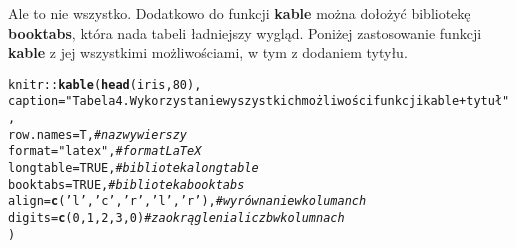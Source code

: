 \documentclass[a4paper, 10pt]{article}\usepackage[]{graphicx}\usepackage[]{color}
\makeatletter
\newcommand{\hlnum}[1]{\textcolor[rgb]{0.686,0.059,0.569}{#1}}%
\newcommand{\hlstr}[1]{\textcolor[rgb]{0.192,0.494,0.8}{#1}}%
\newcommand{\hlcom}[1]{\textcolor[rgb]{0.678,0.584,0.686}{\textit{#1}}}%
\newcommand{\hlopt}[1]{\textcolor[rgb]{0,0,0}{#1}}%
\newcommand{\hlstd}[1]{\textcolor[rgb]{0.345,0.345,0.345}{#1}}%
\newcommand{\hlkwc}[1]{\textcolor[rgb]{0.333,0.667,0.333}{#1}}%
\newcommand{\hlkwd}[1]{\textcolor[rgb]{0.737,0.353,0.396}{\textbf{#1}}}%
\newenvironment{kframe}{%
 \def\at@end@of@kframe{}%
 \ifinner\ifhmode%
  \def\at@end@of@kframe{\end{minipage}}%
  \begin{minipage}{\columnwidth}%
 \fi\fi%
 \def\FrameCommand##1{\hskip\@totalleftmargin \hskip-\fboxsep
 \colorbox{shadecolor}{##1}\hskip-\fboxsep
     \hskip-\linewidth \hskip-\@totalleftmargin \hskip\columnwidth}%
 \MakeFramed {\advance\hsize-\width
   \@totalleftmargin\z@ \linewidth\hsize
   \@setminipage}}%
 {\par\unskip\endMakeFramed%
 \at@end@of@kframe}
\makeatother
\begin{document}
Ale to nie wszystko. Dodatkowo do funkcji \textbf{kable} można dołożyć bibliotekę \textbf{booktabs}, która nada tabeli ładniejszy wygląd. Poniżej zastosowanie funkcji \textbf{kable} z jej wszystkimi możliwościami, w tym z dodaniem tytyłu.


\begin{kframe}
\begin{alltt}
\hlstd{knitr}\hlopt{::} \hlkwd{kable}\hlstd{(} \hlkwd{head}\hlstd{(iris,} \hlnum{80}\hlstd{) ,}
        \hlkwc{caption}\hlstd{=}\hlstr{"Tabela 4. Wykorzystanie wyszystkich możliwości funkcji kable + tytuł"}\hlstd{,}
        \hlkwc{row.names} \hlstd{= T,} \hlcom{# nazwy wierszy}
        \hlkwc{format}\hlstd{=}\hlstr{"latex"}\hlstd{,} \hlcom{# format LaTeX}
        \hlkwc{longtable}\hlstd{=}\hlnum{TRUE}\hlstd{,}  \hlcom{# biblioteka longtable}
        \hlkwc{booktabs}\hlstd{=}\hlnum{TRUE}\hlstd{,} \hlcom{# biblioteka booktabs}
        \hlkwc{align}\hlstd{=}\hlkwd{c}\hlstd{(}\hlstr{'l'}\hlstd{,} \hlstr{'c'}\hlstd{,} \hlstr{'r'}\hlstd{,} \hlstr{'l'}\hlstd{,} \hlstr{'r'}\hlstd{),} \hlcom{# wyrównanie w kolumanch}
        \hlkwc{digits}\hlstd{=}\hlkwd{c}\hlstd{(}\hlnum{0}\hlstd{,}\hlnum{1}\hlstd{,}\hlnum{2}\hlstd{,}\hlnum{3}\hlstd{,}\hlnum{0}\hlstd{)} \hlcom{# zaokrąglenia liczb w kolumnach}
        \hlstd{)}
\end{alltt}
\end{kframe}\begin{table}


\end{table}
\end{document}
